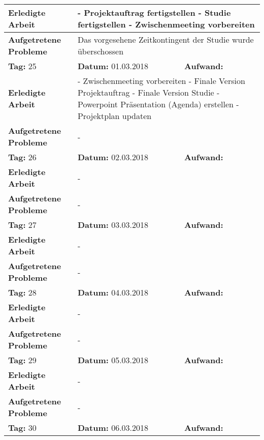 \begin{longtable}{|p{5cm}|p{5cm}|p{6cm}|}
\textbf{Erledigte Arbeit} & \multicolumn{2}{p{11cm}|}{- Projektauftrag fertigstellen \newline
- Studie fertigstellen
- Zwischenmeeting vorbereiten} \\ \hline
\textbf{Aufgetretene Probleme} & \multicolumn{2}{p{11cm}|}{Das vorgesehene Zeitkontingent der Studie wurde überschossen} \\ \hline
\rowcolor{heading}\textbf{Tag:} 25 & \textbf{Datum:} 01.03.2018 & \textbf{Aufwand:} \\ \hline
\textbf{Erledigte Arbeit} & \multicolumn{2}{p{11cm}|}{- Zwischenmeeting vorbereiten \newline
- Finale Version Projektauftrag \newline
- Finale Version Studie \newline
- Powerpoint Präsentation (Agenda) erstellen \newline
- Projektplan updaten } \\ \hline
\textbf{Aufgetretene Probleme} & \multicolumn{2}{p{11cm}|}{-} \\ \hline
\rowcolor{heading}\textbf{Tag:} 26 & \textbf{Datum:} 02.03.2018 & \textbf{Aufwand:} \\ \hline
\textbf{Erledigte Arbeit} & \multicolumn{2}{p{11cm}|}{-} \\ \hline
\textbf{Aufgetretene Probleme} & \multicolumn{2}{p{11cm}|}{-} \\ \hline
\rowcolor{heading}\textbf{Tag:} 27 & \textbf{Datum:} 03.03.2018 & \textbf{Aufwand:} \\ \hline
\textbf{Erledigte Arbeit} & \multicolumn{2}{p{11cm}|}{-} \\ \hline
\textbf{Aufgetretene Probleme} & \multicolumn{2}{p{11cm}|}{-} \\ \hline
\rowcolor{heading}\textbf{Tag:} 28 & \textbf{Datum:} 04.03.2018 & \textbf{Aufwand:} \\ \hline
\textbf{Erledigte Arbeit} & \multicolumn{2}{p{11cm}|}{-} \\ \hline
\textbf{Aufgetretene Probleme} & \multicolumn{2}{p{11cm}|}{-} \\ \hline
\rowcolor{heading}\textbf{Tag:} 29 & \textbf{Datum:} 05.03.2018 & \textbf{Aufwand:} \\ \hline
\textbf{Erledigte Arbeit} & \multicolumn{2}{p{11cm}|}{-} \\ \hline
\textbf{Aufgetretene Probleme} & \multicolumn{2}{p{11cm}|}{-} \\ \hline
\rowcolor{heading}\textbf{Tag:} 30 & \textbf{Datum:} 06.03.2018 & \textbf{Aufwand:} \\ \hline

\end{longtable}
